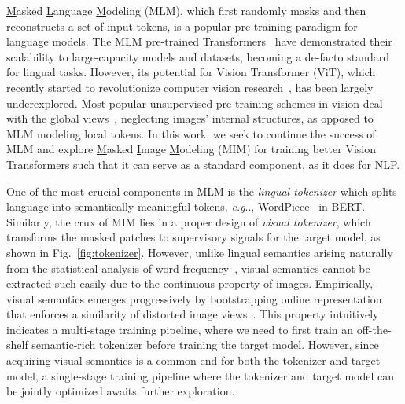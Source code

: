 \documentclass{article} %
\makeatletter
\DeclareRobustCommand\onedot{\futurelet\@let@token\@onedot}
\def\@onedot{\ifx\@let@token.\else.\null\fi\xspace}
\def\eg{\emph{e.g}\onedot} \def\Eg{\emph{E.g}\onedot}
\makeatother
\begin{document}

\underline{M}asked \underline{L}anguage \underline{M}odeling (MLM), which first randomly masks and then reconstructs a set of input tokens, is a popular pre-training paradigm for language models.
The MLM pre-trained Transformers~\citep{bert} have demonstrated their scalability to large-capacity models and datasets, becoming a de-facto standard for lingual tasks.
However, its potential for Vision Transformer (ViT), which recently started to revolutionize computer vision research~\citep{deit, vit}, has been largely underexplored.
Most popular unsupervised pre-training schemes in vision deal with the global views~\citep{mocov3,dino}, neglecting images' internal structures, as opposed to MLM modeling local tokens.  
In this work, we seek to continue the success of MLM and explore \underline{M}asked \underline{I}mage \underline{M}odeling (MIM) for training better Vision Transformers such that it can serve as a standard component, as it does for NLP. 


One of the most crucial components in MLM is the \textit{lingual tokenizer} which splits language into semantically meaningful tokens, \eg, WordPiece~\citep{wordpiece} in BERT. 
Similarly, the crux of MIM lies in a proper design of \textit{visual tokenizer}, which transforms the masked patches to supervisory signals for the target model, as shown in Fig.~\ref{fig:tokenizer}.
However, unlike lingual semantics arising naturally from the statistical analysis of word frequency~\citep{bpe}, 
visual semantics cannot be extracted such easily due to the continuous property of images. Empirically, visual semantics emerges progressively by bootstrapping online representation that enforces a similarity of distorted image views~\citep{moco,byol,swav}.
This property intuitively indicates a multi-stage training pipeline, where we need to first train an off-the-shelf semantic-rich tokenizer before training the target model. However, since acquiring visual semantics is a common end for both the tokenizer and target model, a single-stage training pipeline where the tokenizer and target model can be jointly optimized awaits further exploration.
\end{document}
